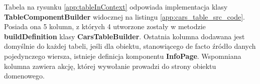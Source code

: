 	Tabela na rysunku \ref{app:tableInContext} odpowiada implementacja klasy \textbf{TableComponentBuilder} widocznej na listingu \ref{app:cars_table_src_code}. Posiada ona 5 kolumn, z których 4 utworzone zostały w metodzie \textbf{buildDefinition} klasy \textbf{CarsTableBuilder}. Ostatnia kolumna dodawana jest domyślnie do każdej tabeli, jeśli dla obiektu, stanowiącego de facto źródło danych pojedynczego wiersza, istnieje definicja komponentu \textbf{InfoPage}. Wspomniana kolumna zawiera akcję, której wywołanie prowadzi do strony obiektu domenowego.

	

